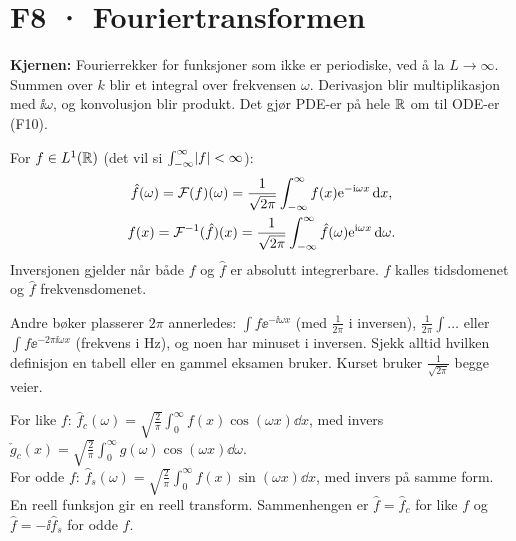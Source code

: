 \section{F8 · Fouriertransformen}

\textbf{Kjernen:} Fourierrekker for funksjoner som ikke er periodiske, ved å la $L\to\infty$. Summen over $k$ blir et integral over frekvensen $\omega$. Derivasjon blir multiplikasjon med $\ii\omega$, og konvolusjon blir produkt. Det gjør PDE-er på hele $\mathbb{R}$ om til ODE-er (F10).

\begin{formel}
For $f\in L^1(\mathbb{R})$ (det vil si $\int_{-\infty}^\infty\lvert f\rvert<\infty$):
\begin{gather*}
\hat f(\omega)=\mathcal{F}(f)(\omega)=\frac1{\sqrt{2\pi}}\int_{-\infty}^{\infty}f(x)\mathrm{e}^{-\mathrm{i}\omega x}\,\mathrm{d} x,\\
f(x)=\mathcal{F}^{-1}(\hat f)(x)=\frac1{\sqrt{2\pi}}\int_{-\infty}^{\infty}\hat f(\omega)\mathrm{e}^{\mathrm{i}\omega x}\,\mathrm{d}\omega .
\end{gather*}
Inversjonen gjelder når både $f$ og $\hat f$ er absolutt integrerbare. $f$ kalles tidsdomenet og $\hat f$ frekvensdomenet.
\end{formel}
\begin{fallgruve}[konvensjoner]
Andre bøker plasserer $2\pi$ annerledes: $\int f\ee^{-\ii\omega x}$ (med $\frac1{2\pi}$ i inversen), $\frac1{2\pi}\int\dots$ eller $\int f\ee^{-2\pi\ii\omega x}$ (frekvens i Hz), og noen har minuset i inversen. Sjekk alltid hvilken definisjon en tabell eller en gammel eksamen bruker. Kurset bruker $\frac1{\sqrt{2\pi}}$ begge veier.
\end{fallgruve}

\begin{defn}
For like $f$: $\hat f_c(\omega)=\sqrt{\frac2\pi}\int_0^\infty f(x)\cos(\omega x)\dd x$, med invers $\check g_c(x)=\sqrt{\frac2\pi}\int_0^\infty g(\omega)\cos(\omega x)\dd\omega$.\\
For odde $f$: $\hat f_s(\omega)=\sqrt{\frac2\pi}\int_0^\infty f(x)\sin(\omega x)\dd x$, med invers på samme form.\\
En reell funksjon gir en reell transform. Sammenhengen er $\hat f=\hat f_c$ for like $f$ og $\hat f=-\ii\hat f_s$ for odde $f$.
\end{defn}

